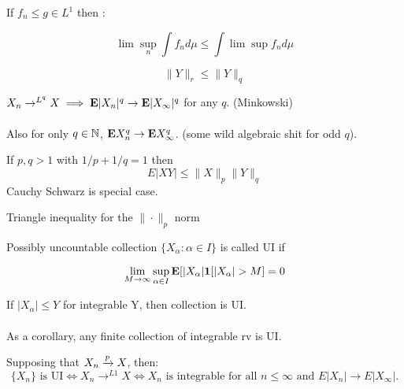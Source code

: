 \documentclass{article}
\newcommand\myworries[1]{\textcolor{red}{#1}}
\begin{document}

\begin{theorem}
If $f_n \leq g \in L^1$ then :

$$\lim \sup_n \int f_n d\mu \leq \int \lim \sup f_n d\mu$$
\end{theorem}

\begin{fact}
$$\|Y\|_r \leq \|Y\|_q$$
\end{fact}

\begin{fact}
$X_n\to^{L^q} X \implies \mathbf{E}|X_n|^q \to \mathbf{E}|X_\infty|^q$ for any $q$. (Minkowski)\\\\ Also for only $q\in \mathbb N$, $\mathbf{E} X_n^q \to \mathbf{E} X_\infty^q$. (some wild algebraic shit for odd $q$).

\end{fact}
\begin{theorem}[Holder's]
If $p,q>1$ with $1/p + 1/q = 1$ then 
$$E|XY| \leq \|X\|_p \|Y\|_q $$
Cauchy Schwarz is special case.
\end{theorem}

\begin{theorem}[Minkowski]
Triangle inequality for the $\|\cdot \|_p $ norm
\end{theorem}

\begin{definition}
Possibly uncountable collection $\{X_\alpha: \alpha \in I\}$ is called UI if 

$$\lim_{M\to\infty} \sup_{\alpha \in I} \mathbf{E}[|X_\alpha| \boldsymbol{1}[|X_\alpha | >M] = 0$$
\end{definition}
\begin{fact}
If $|X_\alpha|\leq Y$ for integrable Y, then collection is UI. \\\\

As a corollary, any finite collection of integrable rv is UI.
\end{fact}

\begin{theorem}
Supposing that $X_n \xrightarrow{p} X$, then:
$$\{X_n\} \text{ is UI} \iff X_n \to^{L1} X \iff X_n \text{ is integrable for all } n\leq \infty \text{ and } E|X_n| \to E|X_\infty|.$$
\end{theorem}
\end{document}
